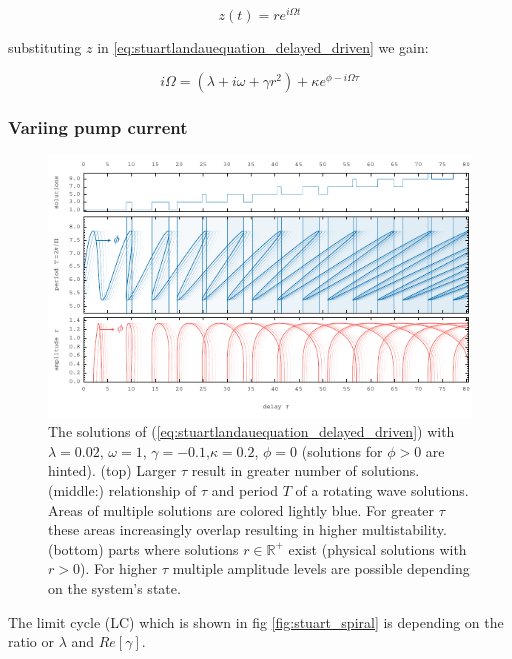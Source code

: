 	\begin{equation}
	z(t) = r e^{i \Omega t}
	\end{equation}

	substituting $z$ in \ref{eq:stuartlandauequation_delayed_driven}  we gain:
	
	\begin{equation}
		i \Omega = (\lambda + i\omega + \gamma r^2) + \kappa e^{\phi-i \Omega \tau} 
	\end{equation}

	\subsubsection{Variing pump current}

\begin{figure}
	\centering
	\includegraphics[width=15cm]{pics/stuart_landau_delaycoupled_per_amp}
	\caption{The solutions of (\ref{eq:stuartlandauequation_delayed_driven}) with $\lambda=0.02$, $\omega=1$, $\gamma=-0.1$,$\kappa=0.2$, $\phi=0$ (solutions for $\phi> 0$ are hinted). (top) Larger $\tau$ result in greater number of solutions. (middle:) relationship of $\tau$ and period $T$ of a rotating wave solutions. Areas of multiple solutions are colored lightly blue. For greater $\tau$ these areas increasingly overlap resulting in higher multistability. (bottom) parts where solutions $r \in \mathbb{R^+}$ exist (physical solutions with $r>0$). For higher $\tau$ multiple amplitude levels are possible depending on the system's state.}
	\label{fig:periodic_solutions_delay_coupled}
\end{figure}



The limit cycle (LC) which is shown in fig \ref{fig:stuart_spiral} is depending on the ratio or $\lambda$ and $Re \left[\gamma \right]$.


